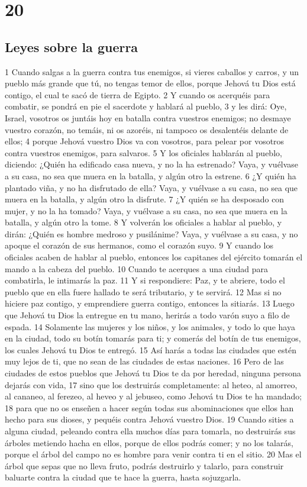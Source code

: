 \chapter{20}


\section{Leyes sobre la guerra}


1 Cuando salgas a la guerra contra tus enemigos, si vieres caballos y carros, y un pueblo más grande que tú, no tengas temor de ellos, porque Jehová tu Dios está contigo, el cual te sacó de tierra de Egipto.
2 Y cuando os acerquéis para combatir, se pondrá en pie el sacerdote y hablará al pueblo,
3 y les dirá: Oye, Israel, vosotros os juntáis hoy en batalla contra vuestros enemigos; no desmaye vuestro corazón, no temáis, ni os azoréis, ni tampoco os desalentéis delante de ellos;
4 porque Jehová vuestro Dios va con vosotros, para pelear por vosotros contra vuestros enemigos, para salvaros.
5 Y los oficiales hablarán al pueblo, diciendo: ¿Quién ha edificado casa nueva, y no la ha estrenado? Vaya, y vuélvase a su casa, no sea que muera en la batalla, y algún otro la estrene.
6 ¿Y quién ha plantado viña, y no ha disfrutado de ella? Vaya, y vuélvase a su casa, no sea que muera en la batalla, y algún otro la disfrute.
7 ¿Y quién se ha desposado con mujer, y no la ha tomado? Vaya, y vuélvase a su casa, no sea que muera en la batalla, y algún otro la tome.
8 Y volverán los oficiales a hablar al pueblo, y dirán: ¿Quién es hombre medroso y pusilánime? Vaya, y vuélvase a su casa, y no apoque el corazón de sus hermanos, como el corazón suyo.
9 Y cuando los oficiales acaben de hablar al pueblo, entonces los capitanes del ejército tomarán el mando a la cabeza del pueblo.
10 Cuando te acerques a una ciudad para combatirla, le intimarás la paz.
11 Y si respondiere: Paz, y te abriere, todo el pueblo que en ella fuere hallado te será tributario, y te servirá.
12 Mas si no hiciere paz contigo, y emprendiere guerra contigo, entonces la sitiarás. 
13 Luego que Jehová tu Dios la entregue en tu mano, herirás a todo varón suyo a filo de espada.
14 Solamente las mujeres y los niños, y los animales, y todo lo que haya en la ciudad, todo su botín tomarás para ti; y comerás del botín de tus enemigos, los cuales Jehová tu Dios te entregó.
15 Así harás a todas las ciudades que estén muy lejos de ti, que no sean de las ciudades de estas naciones.
16 Pero de las ciudades de estos pueblos que Jehová tu Dios te da por heredad, ninguna persona dejarás con vida,
17 sino que los destruirás completamente: al heteo, al amorreo, al cananeo, al ferezeo, al heveo y al jebuseo, como Jehová tu Dios te ha mandado;
18 para que no os enseñen a hacer según todas sus abominaciones que ellos han hecho para sus dioses, y pequéis contra Jehová vuestro Dios.
19 Cuando sities a alguna ciudad, peleando contra ella muchos días para tomarla, no destruirás sus árboles metiendo hacha en ellos, porque de ellos podrás comer; y no los talarás, porque el árbol del campo no es hombre para venir contra ti en el sitio.
20 Mas el árbol que sepas que no lleva fruto, podrás destruirlo y talarlo, para construir baluarte contra la ciudad que te hace la guerra, hasta sojuzgarla.

